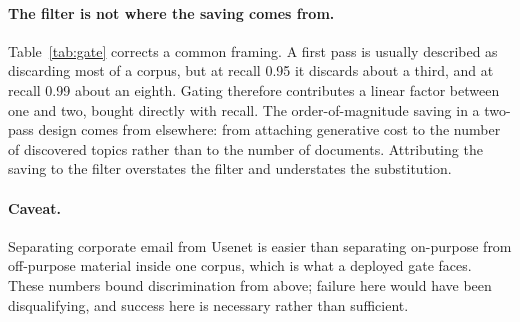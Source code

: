 \paragraph{The filter is not where the saving comes from.}
Table~\ref{tab:gate} corrects a common framing. A first pass is usually described
as discarding most of a corpus, but at recall 0.95 it discards about a third, and
at recall 0.99 about an eighth. Gating therefore contributes a linear factor
between one and two, bought directly with recall. The order-of-magnitude saving
in a two-pass design comes from elsewhere: from attaching generative cost to the
number of discovered topics rather than to the number of documents. Attributing
the saving to the filter overstates the filter and understates the substitution.

\paragraph{Caveat.}
Separating corporate email from Usenet is easier than separating on-purpose from
off-purpose material inside one corpus, which is what a deployed gate faces.
These numbers bound discrimination from above; failure here would have been
disqualifying, and success here is necessary rather than sufficient.
